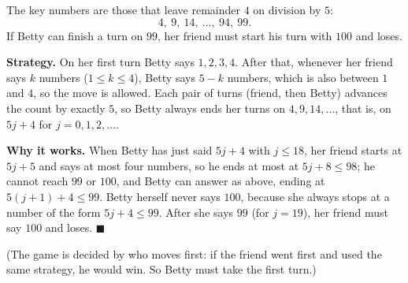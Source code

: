 The key numbers are those that leave remainder $4$ on division by $5$:
\[4,\ 9,\ 14,\ \dots,\ 94,\ 99 .\]
If Betty can finish a turn on $99$, her friend must start his turn with $100$ and loses.

\textbf{Strategy.} On her first turn Betty says $1,2,3,4$. After that, whenever her friend says $k$ numbers ($1\le k\le4$), Betty says $5-k$ numbers, which is also between $1$ and $4$, so the move is allowed. Each pair of turns (friend, then Betty) advances the count by exactly $5$, so Betty always ends her turns on $4,9,14,\dots$, that is, on $5j+4$ for $j=0,1,2,\dots$.

\textbf{Why it works.} When Betty has just said $5j+4$ with $j\le18$, her friend starts at $5j+5$ and says at most four numbers, so he ends at most at $5j+8\le98$; he cannot reach $99$ or $100$, and Betty can answer as above, ending at $5(j+1)+4\le99$. Betty herself never says $100$, because she always stops at a number of the form $5j+4\le99$. After she says $99$ (for $j=19$), her friend must say $100$ and loses. $\blacksquare$

(The game is decided by who moves first: if the friend went first and used the same strategy, he would win. So Betty must take the first turn.)
